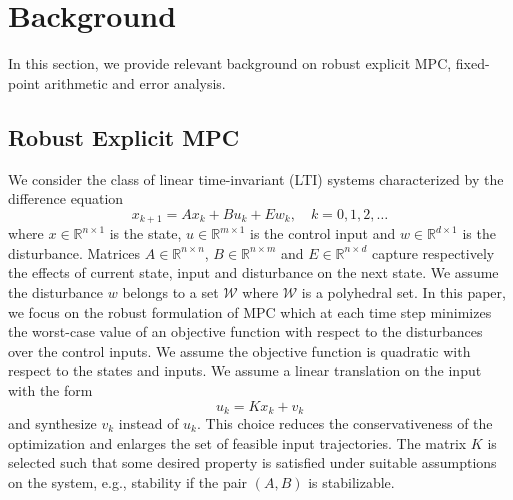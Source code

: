 \section{Background}
In this section, we provide relevant background on robust explicit MPC,
fixed-point arithmetic and error analysis.

\subsection{Robust Explicit MPC}
\def\reals{\mathbb{R}}
We consider the class of linear time-invariant (LTI) systems characterized by the difference equation
\begin{equation}
\label{eq:DSS}
x_{k+1}=Ax_k+Bu_k+Ew_k,\quad  k=0,1,2,\ldots
\end{equation}
where $x\in \reals^{n\times 1}$ is the state, $u\in \reals^{m\times 1}$ is the control input and $w\in \reals^{d\times 1}$ is the disturbance. Matrices $A\in \reals^{n\times n}$, $B\in \reals^{n\times m}$ and $E\in \reals^{n\times d}$  capture respectively the effects of current state, input and disturbance on the next state. We assume the disturbance $w$ belongs to a set $\mathcal{W}$ where $\mathcal{W}$ is a polyhedral set.
In this paper, we focus on the robust formulation of MPC which at each time step
minimizes the worst-case value of an objective function with respect to the
disturbances over the control inputs. We assume the objective function is
quadratic with respect to the states and inputs.
We assume a linear translation on the input with the form
$$u_k=Kx_k+v_k$$
and synthesize $v_k$ instead of $u_k$. This choice reduces the 
conservativeness of the optimization and enlarges the set of feasible input
trajectories. The matrix $K$ is selected such that some desired property is satisfied under suitable assumptions on the system, e.g., stability if the pair $(A,B)$ is stabilizable.

